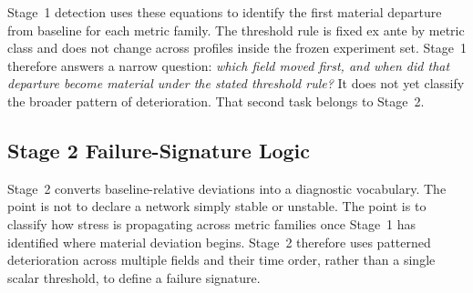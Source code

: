 Stage~1 detection uses these equations to identify the first material departure from baseline for each metric family. The threshold rule is fixed ex ante by metric class and does not change across profiles inside the frozen experiment set. Stage~1 therefore answers a narrow question: \emph{which field moved first, and when did that departure become material under the stated threshold rule?} It does not yet classify the broader pattern of deterioration. That second task belongs to Stage~2.

\subsection{Stage 2 Failure-Signature Logic}
Stage~2 converts baseline-relative deviations into a diagnostic vocabulary. The point is not to declare a network simply stable or unstable. The point is to classify how stress is propagating across metric families once Stage~1 has identified where material deviation begins. Stage~2 therefore uses patterned deterioration across multiple fields and their time order, rather than a single scalar threshold, to define a failure signature.

